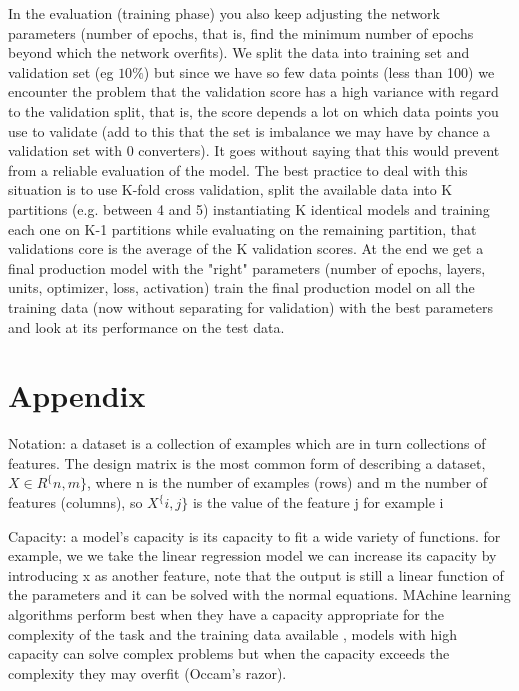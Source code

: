 \documentclass[12pt]{report}
\begin{document}
In the evaluation (training phase) you also keep adjusting the network parameters (number of epochs, that is, find the minimum number of epochs beyond which the network overfits). We split the data into training set and validation set (eg $10\%$) but since we have so few data points (less than 100) we encounter the problem that the validation score has a high variance with regard to the validation split, that is, the score depends a lot on which data points you use to validate (add to this that the set is imbalance we may have by chance a validation set with 0 converters). It goes without saying that this would prevent from a reliable evaluation of the model. 
The best practice to deal with this situation is to use K-fold cross validation, split the available data into K partitions (e.g. between 4 and 5) instantiating K identical models and training each one on K-1 partitions while evaluating on the remaining partition, that validations core is the average of the K validation scores.
At the end we get a final production model with the "right" parameters (number of epochs, layers, units, optimizer, loss, activation) train the final production model on all the training data (now without separating for validation) with the best parameters and look at its performance on the test data.



\section{Appendix}
Notation:  a dataset is a collection of examples which are in turn collections of features. The design matrix is the most common form of describing a dataset, $X \in R^\{n,m\}$, where n is the number of examples (rows) and m the number of features (columns), so $X^\{i,j\}$ is the value of the feature j for example i

Capacity: a model's capacity is its capacity to fit a wide variety of functions. for example, we we take the linear regression model we can increase its capacity by introducing x as another feature, note that the output is still a linear function of the parameters and it can be solved with the normal equations. MAchine learning algorithms perform best when they have a capacity appropriate for the complexity of the task and the training data available , models with high capacity can solve complex problems but when the capacity exceeds the complexity they may overfit (Occam's razor). 
\end{document}
